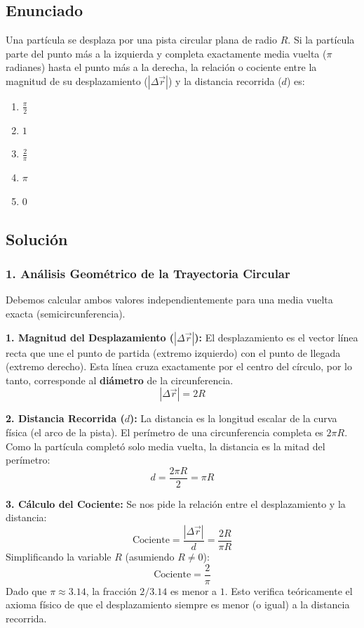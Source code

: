 \documentclass[12pt, a4paper]{article}
\begin{document}
\newpage

\subsection*{Enunciado}
Una partícula se desplaza por una pista circular plana de radio $R$. Si la partícula parte del punto más a la izquierda y completa exactamente media vuelta ($\pi$ radianes) hasta el punto más a la derecha, la relación o cociente entre la magnitud de su desplazamiento ($|\Delta \vec{r}|$) y la distancia recorrida ($d$) es:
\begin{enumerate}[label=\alph*)]
    \item $\frac{\pi}{2}$
    \item $1$
    \item $\frac{2}{\pi}$
    \item $\pi$
    \item $0$
\end{enumerate}

\subsection*{Solución}

\subsubsection*{1. Análisis Geométrico de la Trayectoria Circular}
Debemos calcular ambos valores independientemente para una media vuelta exacta (semicircunferencia).

\textbf{1. Magnitud del Desplazamiento ($|\Delta \vec{r}|$):}
El desplazamiento es el vector línea recta que une el punto de partida (extremo izquierdo) con el punto de llegada (extremo derecho). Esta línea cruza exactamente por el centro del círculo, por lo tanto, corresponde al \textbf{diámetro} de la circunferencia.
$$ |\Delta \vec{r}| = 2R $$

\textbf{2. Distancia Recorrida ($d$):}
La distancia es la longitud escalar de la curva física (el arco de la pista). El perímetro de una circunferencia completa es $2\pi R$. Como la partícula completó solo media vuelta, la distancia es la mitad del perímetro:
$$ d = \frac{2\pi R}{2} = \pi R $$

\textbf{3. Cálculo del Cociente:}
Se nos pide la relación entre el desplazamiento y la distancia:
$$ \text{Cociente} = \frac{|\Delta \vec{r}|}{d} = \frac{2R}{\pi R} $$
Simplificando la variable $R$ (asumiendo $R \neq 0$):
$$ \text{Cociente} = \frac{2}{\pi} $$
Dado que $\pi \approx 3.14$, la fracción $2/3.14$ es menor a $1$. Esto verifica teóricamente el axioma físico de que el desplazamiento siempre es menor (o igual) a la distancia recorrida.
\end{document}
